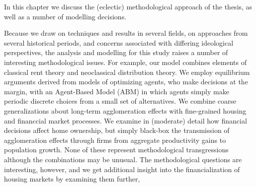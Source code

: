 


In this chapter we discuss the (eclectic) methodological approach of the thesis, as well as a number of modelling decisions. 

Because we draw on techniques and results in several fields, on approaches from several historical periods, and  concerns associated with differing ideological perspectives,  the analysis and modelling for this study raises a number of interesting methodological issues. For example, our model combines elements  of classical rent theory and neoclassical distribution theory. We employ equilibrium arguments derived from models of optimizing agents, who make decisions at the margin,  with an Agent-Based Model (ABM) in which agents simply make periodic discrete choices from  a small set of alternatives. We combine coarse generalizations about long-term agglomeration effects with fine-grained housing and financcial market processes. We examine in (moderate) detail how financial decisions affect home ownership, but simply black-box  the transmission of  agglomeration effects through firms  from aggregate productivity gains to population growth.
None of these represent methodological transgressions although the combinations may be unusual. The methodological questions are interesting, however, and we get additional insight into the financialization of housing markets by examining them further,   


